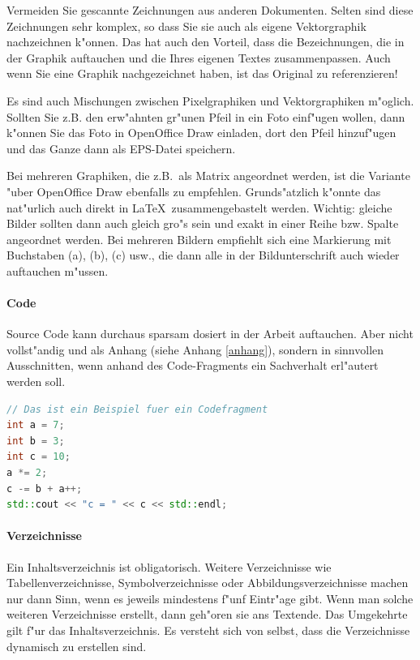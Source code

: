 \documentclass[12pt,a4paper,headinclude,twoside, plainheadsepline, open=right,numbers=noenddot]{scrreprt}
\begin{document}
{Vermeiden Sie gescannte Zeichnungen aus anderen Dokumenten.
Selten sind diese Zeichnungen sehr komplex, so dass Sie sie auch als eigene Vektorgraphik nachzeichnen k"onnen.
Das hat auch den Vorteil, dass die Bezeichnungen, die in der Graphik auftauchen und die Ihres eigenen Textes zusammenpassen.
Auch wenn Sie eine Graphik nachgezeichnet haben, ist das Original zu referenzieren!

Es sind auch Mischungen zwischen Pixelgraphiken und Vektorgraphiken m"oglich.
Sollten Sie z.B. den erw"ahnten gr"unen Pfeil in ein Foto einf"ugen wollen, dann k"onnen Sie das Foto in OpenOffice Draw einladen, dort den Pfeil hinzuf"ugen und das Ganze dann als EPS-Datei speichern.

Bei mehreren Graphiken, die z.B.~als Matrix angeordnet werden, ist die Variante "uber OpenOffice Draw ebenfalls zu empfehlen.
Grunds"atzlich k"onnte das nat"urlich auch direkt in \LaTeX~zusammengebastelt werden.
Wichtig: gleiche Bilder sollten dann auch gleich gro"s sein und exakt in einer Reihe bzw. Spalte angeordnet werden.
Bei mehreren Bildern empfiehlt sich eine Markierung mit Buchstaben (a), (b), (c) usw., die dann alle in der Bildunterschrift auch wieder auftauchen m"ussen.

\paragraph{Code}
Source Code kann durchaus sparsam dosiert in der Arbeit auftauchen.
Aber nicht vollst"andig und als Anhang (siehe Anhang \ref{anhang}), sondern in sinnvollen Ausschnitten, wenn anhand des Code-Fragments ein Sachverhalt erl"autert werden soll.

\begin{lstlisting}[language=C++, breaklines=true, basicstyle=\small, numbers=none]
// Das ist ein Beispiel fuer ein Codefragment
int a = 7;
int b = 3;
int c = 10;
a *= 2;
c -= b + a++;
std::cout << "c = " << c << std::endl;
\end{lstlisting}

\paragraph{Verzeichnisse}
Ein Inhaltsverzeichnis ist obligatorisch. Weitere Verzeichnisse wie Tabellenverzeichnisse, Symbolverzeichnisse oder Abbildungsverzeichnisse machen nur dann Sinn, wenn es jeweils mindestens f"unf Eintr"age gibt.
Wenn man solche weiteren Verzeichnisse erstellt, dann geh"oren sie ans Textende.
Das Umgekehrte gilt f"ur das Inhaltsverzeichnis.
Es versteht sich von selbst, dass die Verzeichnisse dynamisch zu erstellen sind.

}
\end{document}
